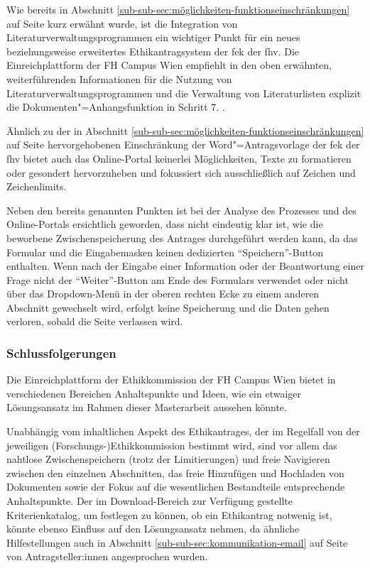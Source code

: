 \documentclass[a4paper,12pt,twoside]{scrreprt}
\begin{document}
\medskip

Wie bereits in Abschnitt \ref{sub-sub-sec:möglichkeiten-funktionseinschränkungen} auf Seite \pageref{sub-sub-sec:möglichkeiten-funktionseinschränkungen} kurz erwähnt wurde, ist die Integration von Literaturverwaltungsprogrammen ein wichtiger Punkt für ein neues beziehungsweise erweitertes Ethikantragsystem der \acl{fek} der \acl{fhv}. Die Einreichplattform der FH Campus Wien empfiehlt in den oben erwähnten, weiterführenden Informationen für die Nutzung von Literaturverwaltungsprogrammen und die Verwaltung von Literaturlisten explizit die Dokumenten"=Anhangsfunktion in Schritt 7. \cite[5]{ethikkommission_fh_campus_wien_wissenswertes_2022}.

\medskip

Ähnlich zu der in Abschnitt \ref{sub-sub-sec:möglichkeiten-funktionseinschränkungen} auf Seite \pageref{sub-sub-sec:möglichkeiten-funktionseinschränkungen} hervorgehobenen Einschränkung der Word"=Antragsvorlage der \ac{fek} der \ac{fhv} bietet auch das Online-Portal keinerlei Möglichkeiten, Texte zu formatieren oder gesondert hervorzuheben und fokussiert sich ausschließlich auf Zeichen und Zeichenlimits.

\medskip

Neben den bereits genannten Punkten ist bei der Analyse des Prozesses und des Online-Portals ersichtlich geworden, dass nicht eindeutig klar ist, wie die beworbene Zwischenspeicherung des Antrages durchgeführt werden kann, da das Formular und die Eingabemasken keinen dedizierten \enquote{Speichern}-Button enthalten. Wenn nach der Eingabe einer Information oder der Beantwortung einer Frage nicht der \enquote{Weiter}-Button am Ende des Formulars verwendet oder nicht über das Dropdown-Menü in der oberen rechten Ecke zu einem anderen Abschnitt gewechselt wird, erfolgt keine Speicherung und die Daten gehen verloren, sobald die Seite verlassen wird.

\subsubsection*{Schlussfolgerungen}
\label{sub-sub-sec:schlussfolgerungen-fhcw}

Die Einreichplattform der Ethikkommission der FH Campus Wien bietet in verschiedenen Bereichen Anhaltspunkte und Ideen, wie ein etwaiger Lösungsansatz im Rahmen dieser Masterarbeit aussehen könnte.

Unabhängig vom inhaltlichen Aspekt des Ethikantrages, der im Regelfall von der jeweiligen (Forschungs-)Ethikkommission bestimmt wird, sind vor allem das nahtlose Zwischenspeichern (trotz der Limitierungen) und freie Navigieren zwischen den einzelnen Abschnitten, das freie Hinzufügen und Hochladen von Dokumenten sowie der Fokus auf die wesentlichen Bestandteile entsprechende Anhaltspunkte. Der im Download-Bereich zur Verfügung gestellte Kriterienkatalog, um festlegen zu können, ob ein Ethikantrag notwenig ist, könnte ebenso Einfluss auf den Lösungsansatz nehmen, da ähnliche Hilfestellungen auch in Abschnitt \ref{sub-sub-sec:kommunikation-email} auf Seite \pageref{sub-sub-sec:kommunikation-email} von Antragsteller:innen angesprochen wurden.
\end{document}
